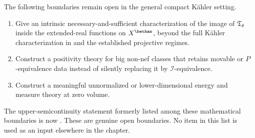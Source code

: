 The following boundaries remain open in the general compact K\"ahler
setting.
\begin{enumerate}
\item Give an intrinsic necessary-and-sufficient characterization of the
      image of \(\mathfrak T_\theta\) inside the extended-real functions
      on \(X^{\bethan}\), beyond the full K\"ahler characterization in
       and the established projective
      regimes.
\item Construct a positivity theory for big non-nef classes that retains
      movable or \(P\)-equivalence data instead of silently replacing it
      by \(\mathcal I\)-equivalence.
\item Construct a meaningful unnormalized or lower-dimensional energy and
      measure theory at zero volume.
\end{enumerate}
The upper-semicontinuity statement formerly listed among these mathematical
boundaries is now .
These are genuine open boundaries.  No item in this list is used as an
input elsewhere in the chapter.
